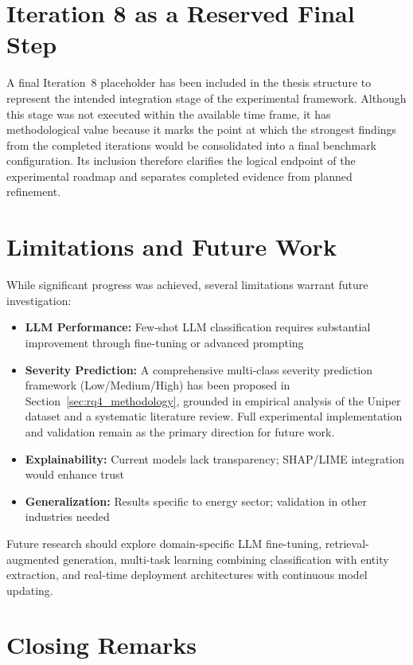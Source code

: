 \documentclass[11pt, titlepage, bibliography=totoc]{scrreprt}
\begin{document}
\section{Iteration 8 as a Reserved Final Step}

A final Iteration~8 placeholder has been included in the thesis structure to represent the intended integration stage of the experimental framework. Although this stage was not executed within the available time frame, it has methodological value because it marks the point at which the strongest findings from the completed iterations would be consolidated into a final benchmark configuration. Its inclusion therefore clarifies the logical endpoint of the experimental roadmap and separates completed evidence from planned refinement.

\section{Limitations and Future Work}

While significant progress was achieved, several limitations warrant future investigation:

\begin{itemize}
    \item \textbf{LLM Performance:} Few-shot LLM classification requires substantial improvement through fine-tuning or advanced prompting
    \item \textbf{Severity Prediction:} A comprehensive multi-class severity prediction framework (Low/Medium/High) has been proposed in Section~\ref{sec:rq4_methodology}, grounded in empirical analysis of the Uniper dataset and a systematic literature review. Full experimental implementation and validation remain as the primary direction for future work.
    \item \textbf{Explainability:} Current models lack transparency; SHAP/LIME integration would enhance trust
    \item \textbf{Generalization:} Results specific to energy sector; validation in other industries needed
\end{itemize}

Future research should explore domain-specific LLM fine-tuning, retrieval-augmented generation, multi-task learning combining classification with entity extraction, and real-time deployment architectures with continuous model updating.

\section{Closing Remarks}
\end{document}
